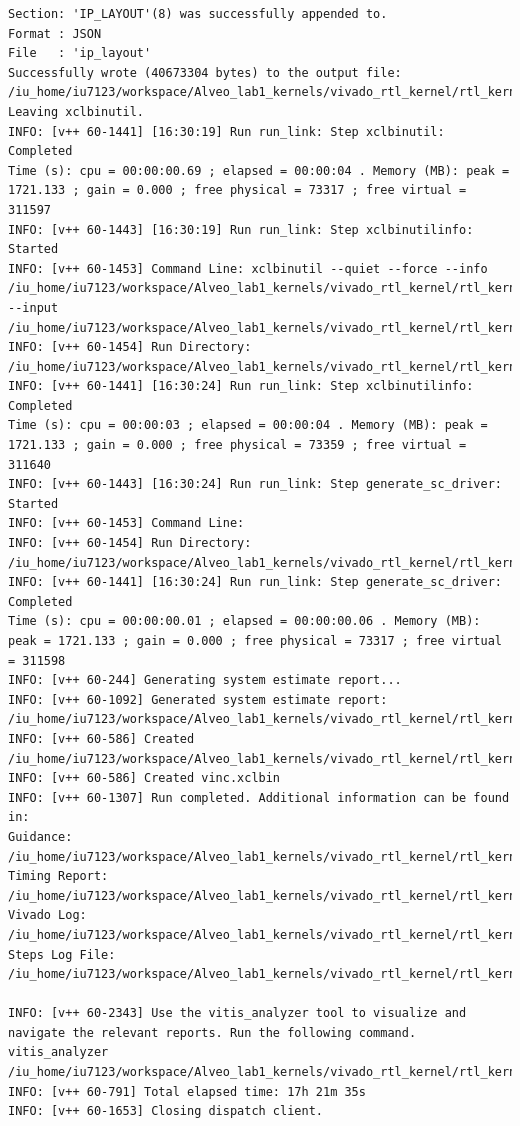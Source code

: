 \begin{lstlisting}
Section: 'IP_LAYOUT'(8) was successfully appended to.
Format : JSON
File   : 'ip_layout'
Successfully wrote (40673304 bytes) to the output file: /iu_home/iu7123/workspace/Alveo_lab1_kernels/vivado_rtl_kernel/rtl_kernel_wizard_2_ex/exports/vinc.xclbin
Leaving xclbinutil.
INFO: [v++ 60-1441] [16:30:19] Run run_link: Step xclbinutil: Completed
Time (s): cpu = 00:00:00.69 ; elapsed = 00:00:04 . Memory (MB): peak = 1721.133 ; gain = 0.000 ; free physical = 73317 ; free virtual = 311597
INFO: [v++ 60-1443] [16:30:19] Run run_link: Step xclbinutilinfo: Started
INFO: [v++ 60-1453] Command Line: xclbinutil --quiet --force --info /iu_home/iu7123/workspace/Alveo_lab1_kernels/vivado_rtl_kernel/rtl_kernel_wizard_2_ex/exports/vinc.xclbin.info --input /iu_home/iu7123/workspace/Alveo_lab1_kernels/vivado_rtl_kernel/rtl_kernel_wizard_2_ex/exports/vinc.xclbin
INFO: [v++ 60-1454] Run Directory: /iu_home/iu7123/workspace/Alveo_lab1_kernels/vivado_rtl_kernel/rtl_kernel_wizard_2_ex/exports/_x/link/run_link
INFO: [v++ 60-1441] [16:30:24] Run run_link: Step xclbinutilinfo: Completed
Time (s): cpu = 00:00:03 ; elapsed = 00:00:04 . Memory (MB): peak = 1721.133 ; gain = 0.000 ; free physical = 73359 ; free virtual = 311640
INFO: [v++ 60-1443] [16:30:24] Run run_link: Step generate_sc_driver: Started
INFO: [v++ 60-1453] Command Line: 
INFO: [v++ 60-1454] Run Directory: /iu_home/iu7123/workspace/Alveo_lab1_kernels/vivado_rtl_kernel/rtl_kernel_wizard_2_ex/exports/_x/link/run_link
INFO: [v++ 60-1441] [16:30:24] Run run_link: Step generate_sc_driver: Completed
Time (s): cpu = 00:00:00.01 ; elapsed = 00:00:00.06 . Memory (MB): peak = 1721.133 ; gain = 0.000 ; free physical = 73317 ; free virtual = 311598
INFO: [v++ 60-244] Generating system estimate report...
INFO: [v++ 60-1092] Generated system estimate report: /iu_home/iu7123/workspace/Alveo_lab1_kernels/vivado_rtl_kernel/rtl_kernel_wizard_2_ex/exports/_x/reports/link/system_estimate_vinc.xtxt
INFO: [v++ 60-586] Created /iu_home/iu7123/workspace/Alveo_lab1_kernels/vivado_rtl_kernel/rtl_kernel_wizard_2_ex/exports/vinc.ltx
INFO: [v++ 60-586] Created vinc.xclbin
INFO: [v++ 60-1307] Run completed. Additional information can be found in:
Guidance: /iu_home/iu7123/workspace/Alveo_lab1_kernels/vivado_rtl_kernel/rtl_kernel_wizard_2_ex/exports/_x/reports/link/v++_link_vinc_guidance.html
Timing Report: /iu_home/iu7123/workspace/Alveo_lab1_kernels/vivado_rtl_kernel/rtl_kernel_wizard_2_ex/exports/_x/reports/link/imp/impl_1_xilinx_u200_xdma_201830_2_bb_locked_timing_summary_routed.rpt
Vivado Log: /iu_home/iu7123/workspace/Alveo_lab1_kernels/vivado_rtl_kernel/rtl_kernel_wizard_2_ex/exports/_x/logs/link/vivado.log
Steps Log File: /iu_home/iu7123/workspace/Alveo_lab1_kernels/vivado_rtl_kernel/rtl_kernel_wizard_2_ex/exports/_x/logs/link/link.steps.log

INFO: [v++ 60-2343] Use the vitis_analyzer tool to visualize and navigate the relevant reports. Run the following command. 
vitis_analyzer /iu_home/iu7123/workspace/Alveo_lab1_kernels/vivado_rtl_kernel/rtl_kernel_wizard_2_ex/exports/vinc.xclbin.link_summary 
INFO: [v++ 60-791] Total elapsed time: 17h 21m 35s
INFO: [v++ 60-1653] Closing dispatch client.
\end{lstlisting}

